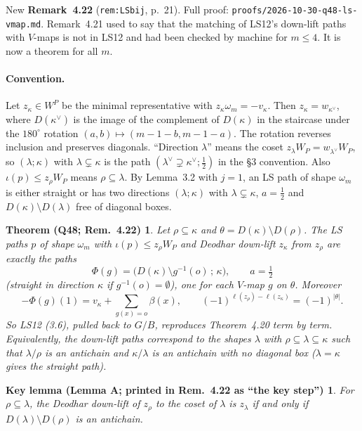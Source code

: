 \documentclass[11pt]{article}
\theoremstyle{plain}
\newtheorem*{thmQ48}{Theorem (Q48; Rem.~4.22)}
\newtheorem*{lemA}{Key lemma (Lemma A; printed in Rem.~4.22 as ``the key step'')}
\theoremstyle{remark}
\begin{document}
New \textbf{Remark~4.22} (\texttt{rem:LSbij}, p.~21). Full proof:
\texttt{proofs/2026-10-30-q48-ls-vmap.md}. Remark~4.21 used to say that the matching of LS12's
down-lift paths with $V$-maps is not in LS12 and had been checked by machine for $m\le4$. It is now a
theorem for all $m$.

\paragraph{Convention.} Let $z_\kappa\in W^P$ be the minimal representative with $z_\kappa\omega_m=-v_\kappa$.
Then $z_\kappa=w_{\kappa^\vee}$, where $D(\kappa^\vee)$ is the image of the complement of $D(\kappa)$ in
the staircase under the $180^\circ$ rotation $(a,b)\mapsto(m-1-b,m-1-a)$. The rotation reverses
inclusion and preserves diagonals. ``Direction $\lambda$'' means the coset
$z_\lambda W_P=w_{\lambda^\vee}W_P$, so $(\lambda;\kappa)$ with $\lambda\subsetneq\kappa$ is the path
$(\lambda^\vee\supsetneq\kappa^\vee;\tfrac12)$ in the \S3 convention. Also $\iota(p)\le z_\rho W_P$
means $\rho\subseteq\lambda$. By Lemma~3.2 with $j=1$, an LS path of shape $\omega_m$ is either
straight or has two directions $(\lambda;\kappa)$ with $\lambda\subsetneq\kappa$, $a=\tfrac12$ and
$D(\kappa)\setminus D(\lambda)$ free of diagonal boxes.

\begin{thmQ48}
Let $\rho\subseteq\kappa$ and $\theta=D(\kappa)\setminus D(\rho)$. The LS paths $p$ of shape $\omega_m$
with $\iota(p)\le z_\rho W_P$ and Deodhar down-lift $z_\kappa$ from $z_\rho$ are exactly the paths
\[
\Phi(g)=\bigl(D(\kappa)\setminus g^{-1}(o)\,;\,\kappa\bigr),\qquad a=\tfrac12
\]
(straight in direction $\kappa$ if $g^{-1}(o)=\emptyset$), one for each $V$-map $g$ on $\theta$.
Moreover
\[
-\Phi(g)(1)=v_\kappa+\sum_{g(x)=o}\beta(x),\qquad(-1)^{\ell(z_\rho)-\ell(z_\kappa)}=(-1)^{|\theta|}.
\]
So LS12 (3.6), pulled back to $G/B$, reproduces Theorem~4.20 term by term. Equivalently, the
down-lift paths correspond to the shapes $\lambda$ with $\rho\subseteq\lambda\subseteq\kappa$ such that
$\lambda/\rho$ is an antichain and $\kappa/\lambda$ is an antichain with no diagonal box ($\lambda=\kappa$
gives the straight path).
\end{thmQ48}

\begin{lemA}
For $\rho\subseteq\lambda$, the Deodhar down-lift of $z_\rho$ to the coset of $\lambda$ is $z_\lambda$
if and only if $D(\lambda)\setminus D(\rho)$ is an antichain.
\end{lemA}
\end{document}
